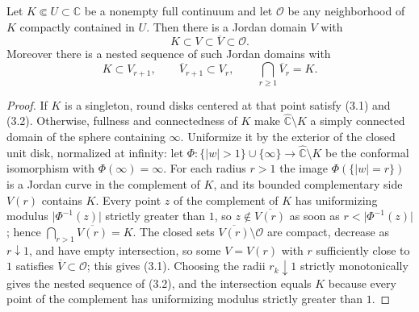 \begin{lemma}\label{lem:jordan-basis}
Let \(K\Subset U\subset\mathbb C\) be a nonempty full continuum and let \(\mathcal O\) be any neighborhood of \(K\) compactly contained in \(U\).  Then there is a Jordan domain \(V\) with
\[
 K\subset V\subset\overline V\subset\mathcal O.               \tag{3.1}
\]
Moreover there is a nested sequence of such Jordan domains with
\[
 K\subset V_{r+1},\qquad \overline V_{r+1}\subset V_r,\qquad \bigcap_{r\ge1}\overline V_r=K.  \tag{3.2}
\]
\end{lemma}

\begin{proof}
If \(K\) is a singleton, round disks centered at that point satisfy (3.1) and (3.2).  Otherwise, fullness and connectedness of \(K\) make \(\widehat{\mathbb C}\setminus K\) a simply connected domain of the sphere containing \(\infty\).  Uniformize it by the exterior of the closed unit disk, normalized at infinity: let \(\Phi\colon\{\lvert w\rvert>1\}\cup\{\infty\}\to\widehat{\mathbb C}\setminus K\) be the conformal isomorphism with \(\Phi(\infty)=\infty\).  For each radius \(r>1\) the image \(\Phi(\{\lvert w\rvert=r\})\) is a Jordan curve in the complement of \(K\), and its bounded complementary side \(V(r)\) contains \(K\).  Every point \(z\) of the complement of \(K\) has uniformizing modulus \(\lvert\Phi^{-1}(z)\rvert\) strictly greater than \(1\), so \(z\notin\overline{V(r)}\) as soon as \(r<\lvert\Phi^{-1}(z)\rvert\); hence \(\bigcap_{r>1}\overline{V(r)}=K\).  The closed sets \(\overline{V(r)}\setminus\mathcal O\) are compact, decrease as \(r\downarrow1\), and have empty intersection, so some \(V=V(r)\) with \(r\) sufficiently close to \(1\) satisfies \(\overline V\subset\mathcal O\); this gives (3.1).  Choosing the radii \(r_k\downarrow1\) strictly monotonically gives the nested sequence of (3.2), and the intersection equals \(K\) because every point of the complement has uniformizing modulus strictly greater than \(1\).
\end{proof}

